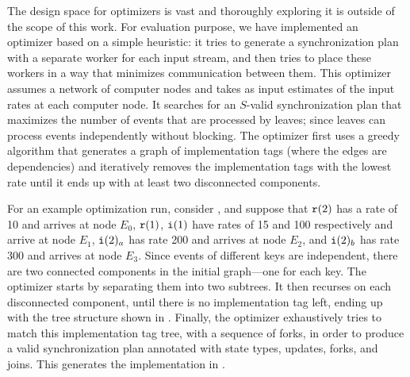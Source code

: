 The design space for optimizers is vast and thoroughly exploring it is
outside of the scope of this work. For evaluation purpose, we have implemented an optimizer based on a simple
heuristic: it tries to generate a synchronization plan with a
separate worker for each input stream, and then tries to place these
workers in a way that minimizes communication between them.
This optimizer assumes a network of computer nodes and takes as input
estimates of the input rates at each computer node. It searches for an
$S$-valid synchronization plan that maximizes the number of events
that are processed by leaves; since leaves can process events
independently without blocking. The optimizer first uses a greedy
algorithm that generates a graph of implementation tags (where the
edges are dependencies) and iteratively removes the implementation
tags with the lowest rate until it ends up with at least two
disconnected components.

\begin{example}
\label{example:optimization}
For an example optimization run, consider ,
and suppose that $\texttt{r}(2)$ has a rate of 10 and arrives at node $E_0$,
$\texttt{r}(1)$, $\texttt{i}(1)$ have rates of 15 and 100 respectively and arrive at node $E_1$,
$\texttt{i}(2)_a$ has rate 200 and arrives at node $E_2$,
and $\texttt{i}(2)_b$ has rate 300 and arrives at node $E_3$.
Since events of different keys are independent, there are
two connected components in the initial graph---one for each
key. The optimizer starts by separating them into two
subtrees. It then recurses on each disconnected component, until there
is no implementation tag left, ending up with the tree structure shown
in . Finally, the optimizer
exhaustively tries to match this implementation tag tree, with a
sequence of forks, in order to produce a valid synchronization plan
annotated with state types, updates, forks, and joins.
This generates the implementation in .
\end{example}

